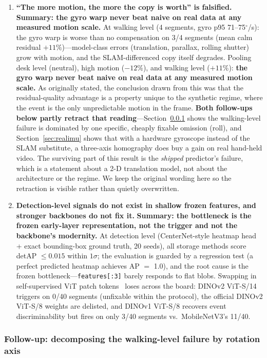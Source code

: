\documentclass[12pt,a4paper]{article}
\begin{document}
\begin{enumerate}
  \item \textbf{``The more motion, the more the copy is worth'' is falsified.}
  \textbf{Summary: the gyro warp never beat naive on real data at any measured motion scale.}
  At walking level (4 segments, gyro p95 71--75$^\circ$/s): the gyro warp is worse than no compensation on 3/4 segments (mean calm residual $+11\%$)---model-class errors (translation, parallax, rolling shutter) grow with motion, and the SLAM-differenced copy itself degrades. Pooling desk level (neutral), high motion ($-12\%$), and walking level ($+11\%$): \textbf{the gyro warp never beat naive on real data at any measured motion scale.} As originally stated, the conclusion drawn from this was that the residual-quality advantage is a property unique to the synthetic regime, where the event is the only unpredictable motion in the frame. \textbf{Both follow-ups below partly retract that reading}---Section~\ref{sec:axiabl} shows the walking-level failure is dominated by one specific, cheaply fixable omission (roll), and Section~\ref{sec:realimu} shows that with a hardware gyroscope instead of the SLAM substitute, a three-axis homography does buy a gain on real hand-held video. The surviving part of this result is the \emph{shipped} predictor's failure, which is a statement about a 2-D translation model, not about the architecture or the regime. We keep the original wording here so the retraction is visible rather than quietly overwritten.
  \item \textbf{Detection-level signals do not exist in shallow frozen features, and stronger backbones do not fix it.}
  \textbf{Summary: the bottleneck is the frozen early-layer representation, not the trigger and not the backbone's modernity.}
  At detection level (CenterNet-style heatmap head + exact bounding-box ground truth, 20 seeds), all storage methods score detAP $\le 0.015$ within $1\sigma$; the evaluation is guarded by a regression test (a perfect predicted heatmap achieves AP $=$ 1.0), and the root cause is the frozen bottleneck---\texttt{features[:3]} barely responds to flat blobs. Swapping in self-supervised ViT patch tokens~\cite{dino2021,dinov2} loses across the board: DINOv2 ViT-S/14 triggers on 0/40 segments (unfixable within the protocol), the official DINOv2 ViT-S/8 weights are delisted, and DINOv1 ViT-S/8 recovers event discriminability but fires on only 3/40 segments vs.\ MobileNetV3's 11/40.
\end{enumerate}

\subsubsection{Follow-up: decomposing the walking-level failure by rotation axis}
\label{sec:axiabl}
\end{document}
